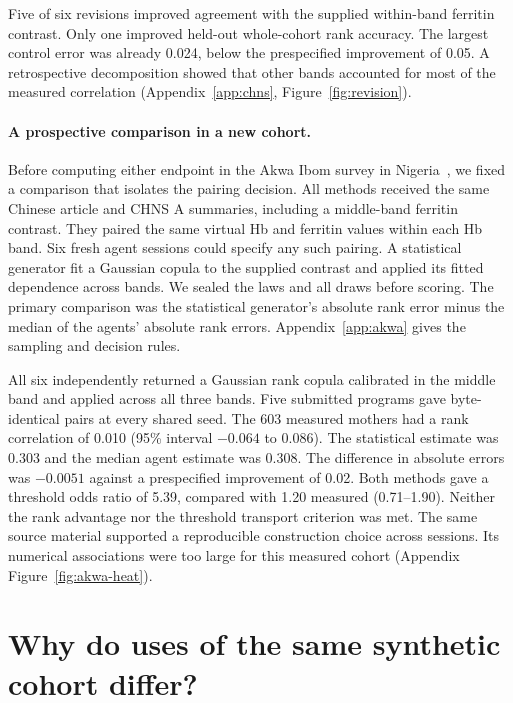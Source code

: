 \documentclass[sigconf,anonymous,review]{acmart}
\begin{document}
Five of six revisions improved agreement with the supplied within-band ferritin contrast. Only one improved held-out whole-cohort rank accuracy. The largest control error was already 0.024, below the prespecified improvement of 0.05. A retrospective decomposition showed that other bands accounted for most of the measured correlation (Appendix~\ref{app:chns}, Figure~\ref{fig:revision}).

\paragraph{A prospective comparison in a new cohort.}
Before computing either endpoint in the Akwa Ibom survey in Nigeria~\cite{akwa_iron}, we fixed a comparison that isolates the pairing decision. All methods received the same Chinese article and CHNS A summaries, including a middle-band ferritin contrast. They paired the same virtual Hb and ferritin values within each Hb band. Six fresh agent sessions could specify any such pairing. A statistical generator fit a Gaussian copula to the supplied contrast and applied its fitted dependence across bands. We sealed the laws and all draws before scoring. The primary comparison was the statistical generator's absolute rank error minus the median of the agents' absolute rank errors. Appendix~\ref{app:akwa} gives the sampling and decision rules.

All six independently returned a Gaussian rank copula calibrated in the middle band and applied across all three bands. Five submitted programs gave byte-identical pairs at every shared seed. The 603 measured mothers had a rank correlation of 0.010 (95\% interval $-0.064$ to 0.086). The statistical estimate was 0.303 and the median agent estimate was 0.308. The difference in absolute errors was $-0.0051$ against a prespecified improvement of 0.02. Both methods gave a threshold odds ratio of 5.39, compared with 1.20 measured (0.71--1.90). Neither the rank advantage nor the threshold transport criterion was met. The same source material supported a reproducible construction choice across sessions. Its numerical associations were too large for this measured cohort (Appendix Figure~\ref{fig:akwa-heat}).

\section{Why do uses of the same synthetic cohort differ?}
\end{document}
